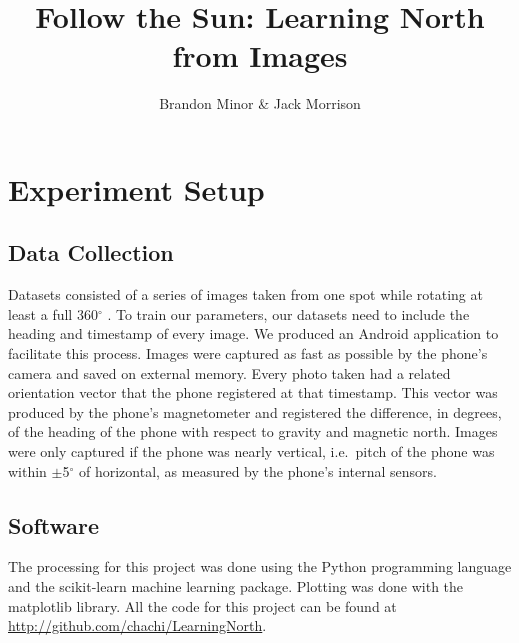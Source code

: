\documentclass{article}
\begin{document}
\title{Follow the Sun: Learning North from Images}
\author{Brandon Minor \& Jack Morrison}
\maketitle


\newcommand{\degrees}{$^\circ$ }


\section{Experiment Setup}

\subsection{Data Collection}
Datasets consisted of a series of images taken from one spot while rotating at least a full 360\degrees.
To train our parameters, our datasets need to include the heading and timestamp of every image. We produced an Android application to facilitate this process. Images were captured as fast as possible by the phone's camera and saved on external memory. Every photo taken had a related orientation vector that the phone registered at that timestamp. This vector was produced by the phone's magnetometer and registered the difference, in degrees, of the heading of the phone with respect to gravity and magnetic north. Images were only captured if the phone was nearly vertical, i.e.\ pitch of the phone was within $\pm$5\degrees of horizontal, as measured by the phone's internal sensors.

\subsection{Software}
The processing for this project was done using the Python programming language and the scikit-learn \cite{scikit-learn} machine learning package. Plotting was done with the matplotlib library. All the code for this project can be found at \url{http://github.com/chachi/LearningNorth}.
\end{document}
